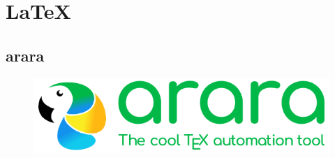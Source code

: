 \chapter{\LaTeX}

\lipsum[1]
\begin{figure}
	
\end{figure}
\lipsum[1]

\section{arara}

\lipsum[1]
\begin{figure}
	\includegraphics[width=0.19\paperwidth]{./img/arara}
\end{figure}
\lipsum[1]